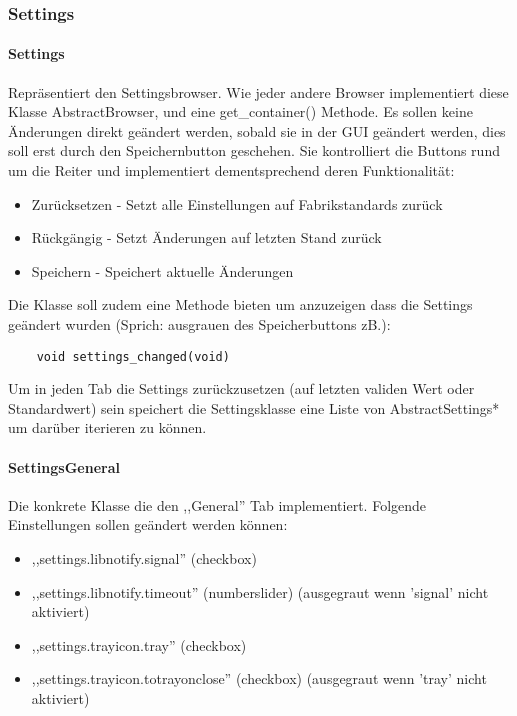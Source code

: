 \subsubsection{Settings}
\paragraph{Settings}
Repräsentiert den Settingsbrowser. Wie jeder andere Browser implementiert diese Klasse AbstractBrowser, und eine get\_container() Methode.
Es sollen keine Änderungen direkt geändert werden, sobald sie in der GUI geändert werden, dies soll erst durch den Speichernbutton geschehen.
Sie kontrolliert die Buttons rund um die Reiter und implementiert dementsprechend deren Funktionalität:
\begin{itemize}
\item Zurücksetzen - Setzt alle Einstellungen auf Fabrikstandards zurück
\item Rückgängig - Setzt Änderungen auf letzten Stand zurück
\item Speichern - Speichert aktuelle Änderungen
\end{itemize}

Die Klasse soll zudem eine Methode bieten um anzuzeigen dass die Settings geändert wurden (Sprich: ausgrauen des Speicherbuttons zB.):
\begin{verbatim}
    void settings_changed(void)
\end{verbatim}
Um in jeden Tab die Settings zurückzusetzen (auf letzten validen Wert oder Standardwert) sein speichert die Settingsklasse eine Liste von AbstractSettings* 
um darüber iterieren zu können. 


\paragraph{SettingsGeneral}
Die konkrete Klasse die den ,,General'' Tab implementiert.
Folgende Einstellungen sollen geändert werden können:
\begin{itemize}
\item ,,settings.libnotify.signal'' (checkbox)
\item ,,settings.libnotify.timeout'' (numberslider) (ausgegraut wenn 'signal' nicht aktiviert)
\item ,,settings.trayicon.tray'' (checkbox)
\item ,,settings.trayicon.totrayonclose'' (checkbox) (ausgegraut wenn 'tray' nicht aktiviert)
\end{itemize}

